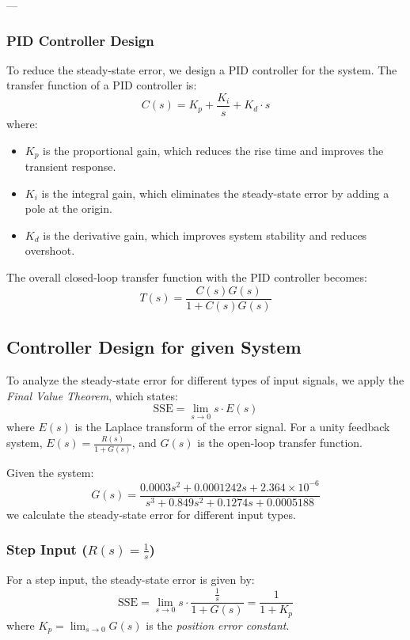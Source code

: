 \documentclass{article}
\begin{document}
---

\subsubsection{PID Controller Design}

To reduce the steady-state error, we design a PID controller for the system. The transfer function of a PID controller is:
\[
C(s) = K_p + \frac{K_i}{s} + K_d \cdot s
\]
where:
\begin{itemize}
    \item \( K_p \) is the proportional gain, which reduces the rise time and improves the transient response.
    \item \( K_i \) is the integral gain, which eliminates the steady-state error by adding a pole at the origin.
    \item \( K_d \) is the derivative gain, which improves system stability and reduces overshoot.
\end{itemize}

The overall closed-loop transfer function with the PID controller becomes:
\[
T(s) = \frac{C(s)G(s)}{1 + C(s)G(s)}
\]

\subsection{Controller Design for given System}

To analyze the steady-state error for different types of input signals, we apply the \textit{Final Value Theorem}, which states:
\[
\text{SSE} = \lim_{s \to 0} s \cdot E(s)
\]
where \(E(s)\) is the Laplace transform of the error signal. For a unity feedback system, \(E(s) = \frac{R(s)}{1 + G(s)}\), and \(G(s)\) is the open-loop transfer function.

Given the system:
\[
G(s) = \frac{0.0003 s^2 + 0.0001242 s + 2.364 \times 10^{-6}}{s^3 + 0.849 s^2 + 0.1274 s + 0.0005188}
\]
we calculate the steady-state error for different input types.


\subsubsection{Step Input (\( R(s) = \frac{1}{s} \))}
\label{PIDControllerDesignStep}
For a step input, the steady-state error is given by:
\[
\text{SSE} = \lim_{s \to 0} s \cdot \frac{\frac{1}{s}}{1 + G(s)} = \frac{1}{1 + K_p}
\]
where \( K_p = \lim_{s \to 0} G(s) \) is the \textit{position error constant}.
\end{document}
